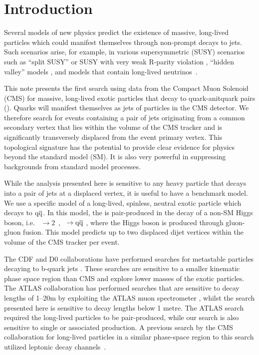 \section{Introduction}
\label{sec:Introduction}

Several models of new physics predict the existence of massive, long-lived particles which could
manifest themselves through non-prompt decays to jets. Such scenarios arise, for example,
in various supersymmetric (SUSY) scenarios such as ``split SUSY''
\cite{Hewett:2004nw} or SUSY with very weak R-parity violation \cite{Barbier:2004ez}, ``hidden valley'' models \cite{Han:2007ae}, and \Zprime models
that contain long-lived neutrinos~\cite{Basso:2008iv}.

This note presents the first search using data from the Compact Muon
Solenoid (CMS) for massive, long-lived exotic particles \X that decay 
to quark-anitquark pairs (\qq). Quarks will manifest themselves as jets of particles in the CMS detector. 
We therefore search for events
containing a pair of jets originating from a common secondary
vertex that lies within the volume of the CMS tracker and is significantly transversely displaced from the event
 primary vertex.
This topological signature has the potential to provide clear evidence for
physics beyond the standard model (SM). It is also very powerful in suppressing backgrounds from 
standard model processes.

While the analysis presented here is sensitive to any heavy particle that decays into a pair of jets
 at a displaced vertex, it is useful to have a benchmark model.
We use a specific model of a long-lived, spinless, neutral
exotic particle \X which decays to $\mathrm{q}\overline{\mathrm{q}}$. In this 
model, the \X is pair-produced in the decay of a non-SM Higgs boson, i.e.  \Higgs~$\to
2$\X~, \X~$\to \qq$ \cite{Strassler:2006ri}, where the Higgs boson is produced through gluon-gluon
fusion. This model predicts up to two displaced
dijet vertices within the volume of the CMS tracker per event. 

The CDF and D0 collaborations have performed searches for metastable particles decaying to b-quark jets
\cite{Aaltonen:2011rja, Abazov:2009ik}.
These searches are sensitive to a smaller kinematic phase space region than CMS and explore
lower masses of the exotic particles. The ATLAS collaboration
has performed searches that are sensitive to decay lengths of 1--20\unit{m} by exploiting the ATLAS muon
 spectrometer \cite{ATLAS:2012av}, whilst the search presented here is sensitive to decay lengths below 1 metre.
 The ATLAS search required the long-lived particles to be pair-produced,
while our search  
is also sensitive to single or associated production. 
A previous search by the CMS collaboration for long-lived particles in a similar phase-space region 
to this search utilized leptonic decay channels~\cite{Chatrchyan:2012jna}.
